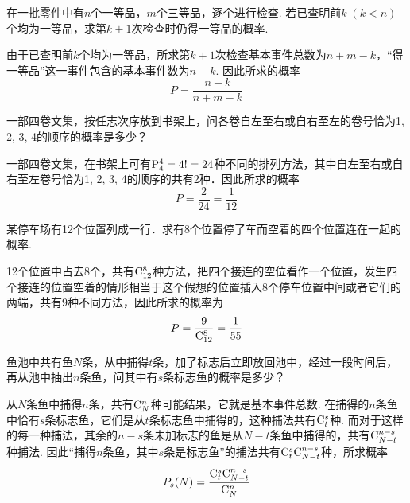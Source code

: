 \begin{example}
    在一批零件中有$n$个一等品，$m$个三等品，逐个进行检查. 若已查明前$k\;(k<n)$个均为一等品，求第$k+1$次检查时仍得一等品的概率.
\end{example}

\begin{solution}
    由于已查明前$k$个均为一等品，所求第$k+1$次检查基本事件总数为$n+m-k$，“得一等品”这一事件包含的基本事件数为$n-k$. 因此所求的概率
    \[P=\frac{n-k}{n+m-k}\]
\end{solution}


\begin{example}
    一部四卷文集，按任志次序放到书架上，问各卷自左至右或自右至左的卷号恰为1, 2, 3, 4的顺序的概率是多少？
\end{example}

\begin{solution}
    一部四卷文集，在书架上可有${\rm P}^{4}_{4}=4!=24$种不同的排列方法，其中自左至右或自右至左卷号恰为1, 2, 3, 4的顺序的共有2种．因此所求的概率
    \[P=\frac{2}{24}=\frac{1}{12}\]
\end{solution}

\begin{example}
    某停车场有12个位置列成一行．求有8个位置停了车而空着的四个位置连在一起的概率.
\end{example}

\begin{solution}
12个位置中占去8个，共有${\rm C}^{8}_{12}$种方法，把四个接连的空位看作一个位置，发生四个接连的位置空着的情形相当于这个假想的位置插入8个停车位置中间或者它们的两端，共有9种不同方法，因此所求的概率为
\[P=\dfrac{9}{{\rm C}^{8}_{12}}=\dfrac{1}{55}\]
\end{solution}

\begin{example}
    鱼池中共有鱼$N$条，从中捕得$t$条，加了标志后立即放回池中，经过一段时间后，再从池中抽出$n$条鱼，问其中有$s$条标志鱼的概率是多少？
\end{example}

\begin{solution}
    从$N$条鱼中捕得$n$条，共有${\rm C}^{n}_{N}$种可能结果，它就是基本事件总数. 在捕得的$n$条鱼中恰有$s$条标志鱼，它们是从$t$条标志鱼中捕得的，这种捕法共有${\rm C}^{s}_{t}$种. 而对于这样的每一种捕法，其余的$n-s$条未加标志的鱼是从$N-t$条鱼中捕得的，共有${\rm C}^{n-s}_{N-t}$种捕法. 因此“捕得$n$条鱼，其中$s$条是标志鱼”的捕法共有${\rm C}^{s}_{t}{\rm C}^{n-s}_{N-t}$种，所求概率
\[P_s(N)=\dfrac{{\rm C}^{s}_{t}{\rm C}^{n-s}_{N-t}}{{\rm C}^{n}_{N}}\]
\end{solution}

